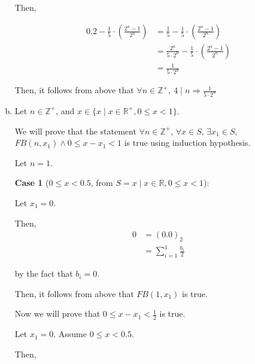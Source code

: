 \documentclass[12pt]{article}
\begin{document}
\begin{enumerate}[a.]
    \bigskip

    Then,

    \begin{align}
        0.2 - \frac{1}{5} \cdot \left( \frac{2^n - 1}{2^n} \right) &= \frac{1}{5} - \frac{1}{5} \cdot \left( \frac{2^n - 1}{2^n} \right)\\
        &= \frac{2^n}{5 \cdot 2^n} - \frac{1}{5} \cdot \left( \frac{2^n - 1}{2^n} \right)\\
        &= \frac{1}{5 \cdot 2^n}
    \end{align}

    Then, it follows from above that $\forall n \in \mathbb{Z}^{+},\: 4 \mid n
    \Rightarrow \frac{1}{5 \cdot 2^n}$

    \item

    Let $n \in \mathbb{Z}^{+}$, and $x \in \{x \mid x \in \mathbb{R}^{+}, 0
    \leq x < 1\}$.

    \bigskip

    We will prove that the statement $\forall n \in \mathbb{Z}^{+}$, $\forall x
    \in S$, $\exists x_1 \in S$, $FB(n, x_1)\land 0 \leq x - x_1 < 1$ is true
    using induction hypothesis.

    \bigskip

    Let $n = 1$.

    \textbf{Case 1} ($0 \leq x < 0.5$, from $S = {x \mid x \in \mathbb{R}, 0 \leq x < 1}$):

    \bigskip

    Let $x_1 = 0$.

    \bigskip

    Then,
    \setcounter{equation}{0}
    \begin{align}
        0 &= (0.0)_2\\
        &= \sum\limits_{i=1}^1 \frac{b_i}{2}
    \end{align}

    by the fact that $b_i = 0$.

    \bigskip

    Then, it follows from above that $FB(1,x_1)$ is true.

    \bigskip

    Now we will prove that $0 \leq x - x_1 < \frac{1}{2}$ is true.

    \bigskip

    Let $x_1 = 0$. Assume $0 \leq x < 0.5$.

    \bigskip

    Then,


\end{enumerate}
\end{document}
